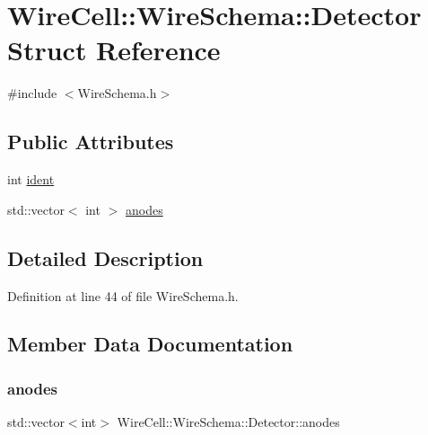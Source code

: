 \hypertarget{struct_wire_cell_1_1_wire_schema_1_1_detector}{}\section{Wire\+Cell\+:\+:Wire\+Schema\+:\+:Detector Struct Reference}
\label{struct_wire_cell_1_1_wire_schema_1_1_detector}


{\ttfamily \#include $<$Wire\+Schema.\+h$>$}

\subsection*{Public Attributes}
\begin{DoxyCompactItemize}
\item 
int \hyperlink{struct_wire_cell_1_1_wire_schema_1_1_detector_a0c682269dd4c3dea3b0095d6bbce1938}{ident}
\item 
std\+::vector$<$ int $>$ \hyperlink{struct_wire_cell_1_1_wire_schema_1_1_detector_a146e4f8fdcb2beaaf6b12aa2af8a8461}{anodes}
\end{DoxyCompactItemize}


\subsection{Detailed Description}


Definition at line 44 of file Wire\+Schema.\+h.



\subsection{Member Data Documentation}
\mbox{\label{struct_wire_cell_1_1_wire_schema_1_1_detector_a146e4f8fdcb2beaaf6b12aa2af8a8461}} 
\subsubsection{\texorpdfstring{anodes}{anodes}}
{\footnotesize\ttfamily std\+::vector$<$int$>$ Wire\+Cell\+::\+Wire\+Schema\+::\+Detector\+::anodes}



